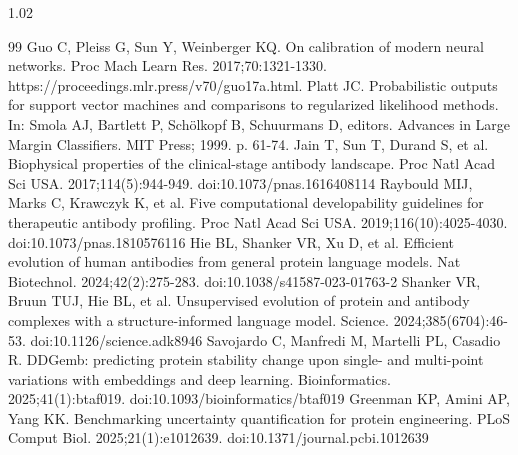 \documentclass[12pt]{article}
\begin{document}
\begin{spacing}{1.02}
\begin{thebibliography}{99}
 Guo C, Pleiss G, Sun Y, Weinberger KQ. On calibration of modern neural networks. Proc Mach Learn Res. 2017;70:1321-1330. https://proceedings.mlr.press/v70/guo17a.html.
 Platt JC. Probabilistic outputs for support vector machines and comparisons to regularized likelihood methods. In: Smola AJ, Bartlett P, Schölkopf B, Schuurmans D, editors. Advances in Large Margin Classifiers. MIT Press; 1999. p. 61-74.
 Jain T, Sun T, Durand S, et al. Biophysical properties of the clinical-stage antibody landscape. Proc Natl Acad Sci USA. 2017;114(5):944-949. doi:10.1073/pnas.1616408114
 Raybould MIJ, Marks C, Krawczyk K, et al. Five computational developability guidelines for therapeutic antibody profiling. Proc Natl Acad Sci USA. 2019;116(10):4025-4030. doi:10.1073/pnas.1810576116
 Hie BL, Shanker VR, Xu D, et al. Efficient evolution of human antibodies from general protein language models. Nat Biotechnol. 2024;42(2):275-283. doi:10.1038/s41587-023-01763-2
 Shanker VR, Bruun TUJ, Hie BL, et al. Unsupervised evolution of protein and antibody complexes with a structure-informed language model. Science. 2024;385(6704):46-53. doi:10.1126/science.adk8946
 Savojardo C, Manfredi M, Martelli PL, Casadio R. DDGemb: predicting protein stability change upon single- and multi-point variations with embeddings and deep learning. Bioinformatics. 2025;41(1):btaf019. doi:10.1093/bioinformatics/btaf019
 Greenman KP, Amini AP, Yang KK. Benchmarking uncertainty quantification for protein engineering. PLoS Comput Biol. 2025;21(1):e1012639. doi:10.1371/journal.pcbi.1012639
\end{thebibliography}
\end{spacing}
\end{document}
